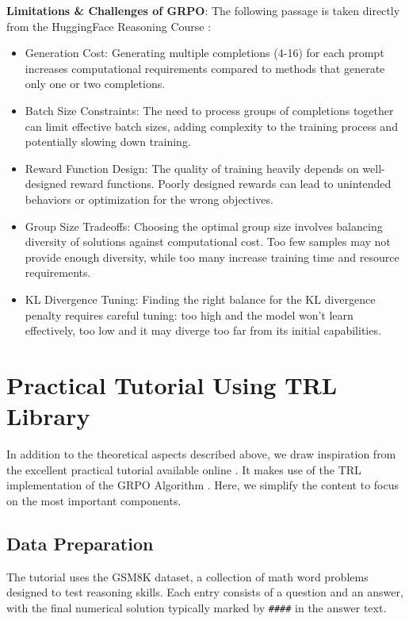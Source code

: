 \documentclass{article}
\begin{document}
\noindent\textbf{Limitations \& Challenges of GRPO}:
The following passage is taken directly from the HuggingFace Reasoning Course \citep{reasoning_course}:
\begin{itemize}
    \item Generation Cost: Generating multiple completions (4-16) for each prompt increases computational requirements compared to methods that generate only one or two completions.
\item Batch Size Constraints: The need to process groups of completions together can limit effective batch sizes, adding complexity to the training process and potentially slowing down training.
\item Reward Function Design: The quality of training heavily depends on well-designed reward functions. Poorly designed rewards can lead to unintended behaviors or optimization for the wrong objectives.
\item Group Size Tradeoffs: Choosing the optimal group size involves balancing diversity of solutions against computational cost. Too few samples may not provide enough diversity, while too many increase training time and resource requirements.
\item KL Divergence Tuning: Finding the right balance for the KL divergence penalty requires careful tuning: too high and the model won’t learn effectively, too low and it may diverge too far from its initial capabilities.
\end{itemize}

\section{Practical Tutorial Using TRL Library}
\label{sec:tutorial}

In addition to the theoretical aspects described above, we draw inspiration from the excellent practical tutorial available online \citep{huggingface_unsloth_colab}. It makes use of the TRL implementation of the GRPO Algorithm \citep{trl}. Here, we simplify the content to focus on the most important components.


\subsection*{Data Preparation}

The tutorial uses the GSM8K dataset, a collection of math word problems designed to test reasoning skills. Each entry consists of a question and an answer, with the final numerical solution typically marked by \texttt{\#\#\#\#} in the answer text. 
\end{document}

